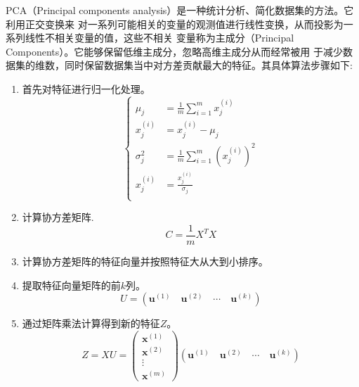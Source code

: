PCA（Principal components analysis）是一种统计分析、简化数据集的方法。它利用正交变换来
对一系列可能相关的变量的观测值进行线性变换，从而投影为一系列线性不相关变量的值，这些不相关
变量称为主成分（Principal Components）。它能够保留低维主成分，忽略高维主成分从而经常被用
于减少数据集的维数，同时保留数据集当中对方差贡献最大的特征。其具体算法步骤如下:
\begin{enumerate}
    \item 首先对特征进行归一化处理。
        \begin{equation}
            \left\{
            \begin{aligned}
                \mu_{j}&=\frac{1}{m} \sum_{i=1}^{m} x_{j}^{(i)} \\
                x_{j}^{(i)}&=x_{j}^{(i)}-\mu_{j} \\
                \sigma_{j}^{2}&=\frac{1}{m}
                \sum_{i=1}^{m}\left(x_{j}^{(i)}\right)^{2} \\
                x_{j}^{(i)}&=\frac{x_{j}^{(i)}}{\sigma_{j}} \\
            \end{aligned}
            \right.
        \end{equation}
    \item 计算协方差矩阵.\begin{equation}
        C=\frac{1}{m} X^{T} X
    \end{equation}
    \item 计算协方差矩阵的特征向量并按照特征大从大到小排序。
    \item 提取特征向量矩阵的前$k$列。\begin{equation}
        U=\left(
            \boldsymbol u^{(1)} \quad \boldsymbol u^{(2)} \quad \cdots \quad \boldsymbol u^{(k)}
            \right)
    \end{equation}
    \item 通过矩阵乘法计算得到新的特征$Z$。\begin{equation}
            Z=X U=\left(\begin{array}{c}
            \boldsymbol x^{(1)} \\
            \boldsymbol x^{(2)} \\
            \vdots \\
            \boldsymbol x^{(m)}
            \end{array}\right)
            \left( \boldsymbol u^{(1)} \quad \boldsymbol u^{(2)} \quad \cdots
            \quad \boldsymbol u^{(k)} \right)
    \end{equation}
\end{enumerate}
